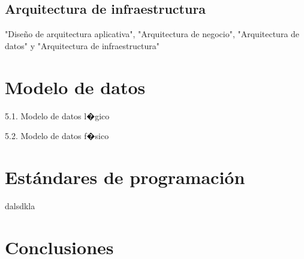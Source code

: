 \documentclass[a4paper,openright,12pt]{book}
\begin{document}
\section{Arquitectura de infraestructura}

 "Diseño de arquitectura aplicativa", "Arquitectura de negocio", "Arquitectura de datos" y "Arquitectura de infraestructura"

\chapter*{Modelo de datos} \label{cap.modelo}%

5.1. Modelo de datos l�gico

5.2. Modelo de datos f�sico

\chapter*{Est\'andares de programaci\'on} \label{cap.estandares}%

dalsdkla

\chapter*{Conclusiones} \label{cap.conclusiones}%
\end{document}
